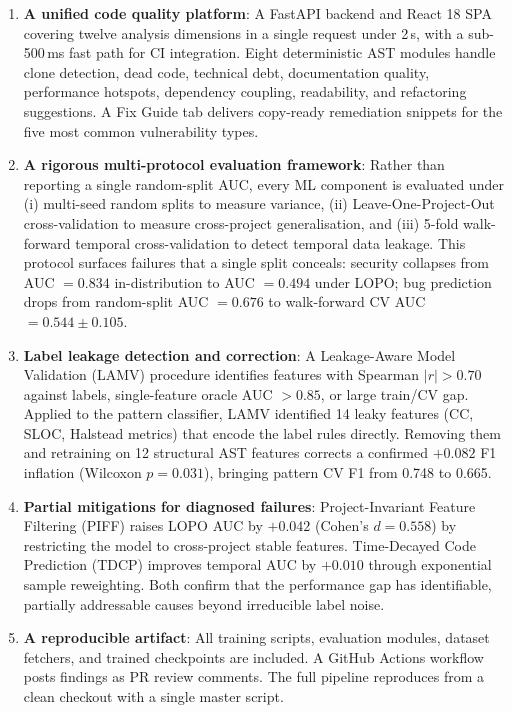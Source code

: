 \documentclass[12pt, oneside]{report}
\begin{document}
\begin{enumerate}
  \item \textbf{A unified code quality platform}: A FastAPI backend and React 18 SPA
    covering twelve analysis dimensions in a single request under 2\,s, with a
    sub-500\,ms fast path for CI integration. Eight deterministic AST modules handle
    clone detection, dead code, technical debt, documentation quality, performance
    hotspots, dependency coupling, readability, and refactoring suggestions. A Fix
    Guide tab delivers copy-ready remediation snippets for the five most common
    vulnerability types.

  \item \textbf{A rigorous multi-protocol evaluation framework}: Rather than reporting
    a single random-split AUC, every ML component is evaluated under (i) multi-seed
    random splits to measure variance, (ii) Leave-One-Project-Out cross-validation to
    measure cross-project generalisation, and (iii) 5-fold walk-forward temporal
    cross-validation to detect temporal data leakage. This protocol surfaces failures
    that a single split conceals: security collapses from AUC $= 0.834$ in-distribution
    to AUC $= 0.494$ under LOPO; bug prediction drops from random-split AUC $= 0.676$
    to walk-forward CV AUC $= 0.544 \pm 0.105$.

  \item \textbf{Label leakage detection and correction}: A Leakage-Aware Model
    Validation (LAMV) procedure identifies features with Spearman $|r| > 0.70$ against
    labels, single-feature oracle AUC $> 0.85$, or large train/CV gap. Applied to the
    pattern classifier, LAMV identified 14 leaky features (CC, SLOC, Halstead metrics)
    that encode the label rules directly. Removing them and retraining on 12 structural
    AST features corrects a confirmed $+0.082$ F1 inflation (Wilcoxon $p = 0.031$),
    bringing pattern CV F1 from 0.748 to 0.665.

  \item \textbf{Partial mitigations for diagnosed failures}: Project-Invariant Feature
    Filtering (PIFF) raises LOPO AUC by $+0.042$ (Cohen's $d = 0.558$) by restricting
    the model to cross-project stable features. Time-Decayed Code Prediction (TDCP)
    improves temporal AUC by $+0.010$ through exponential sample reweighting. Both
    confirm that the performance gap has identifiable, partially addressable causes
    beyond irreducible label noise.

  \item \textbf{A reproducible artifact}: All training scripts, evaluation modules,
    dataset fetchers, and trained checkpoints are included. A GitHub Actions workflow
    posts findings as PR review comments. The full pipeline reproduces from a clean
    checkout with a single master script.
\end{enumerate}
\end{document}
